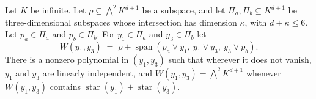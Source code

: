 \begin{lemma}
  \label{lem:pencil-d-stars-three}
  \leanok
  Let $K$ be infinite. Let $\rho \subseteq \bigwedge^2 K^{d+1}$ be a
  subspace, and let $\Pi_a, \Pi_b \subseteq K^{d+1}$ be three-dimensional
  subspaces whose intersection has dimension $\kappa$, with
  $d + \kappa \le 6$. Let $p_a \in \Pi_a$ and $p_b \in \Pi_b$. For
  $y_1 \in \Pi_a$ and $y_3 \in \Pi_b$ let
  \[
    W(y_1, y_3) \;=\; \rho + \operatorname{span}(p_a \vee y_1,\
    y_1 \vee y_3,\ y_3 \vee p_b).
  \]
  There is a nonzero polynomial in $(y_1, y_3)$ such that wherever it
  does not vanish, $y_1$ and $y_3$ are linearly independent, and
  $W(y_1, y_3) = \bigwedge^2 K^{d+1}$ whenever $W(y_1, y_3)$ contains
  $\operatorname{star}(y_1) + \operatorname{star}(y_3)$.
\end{lemma}
